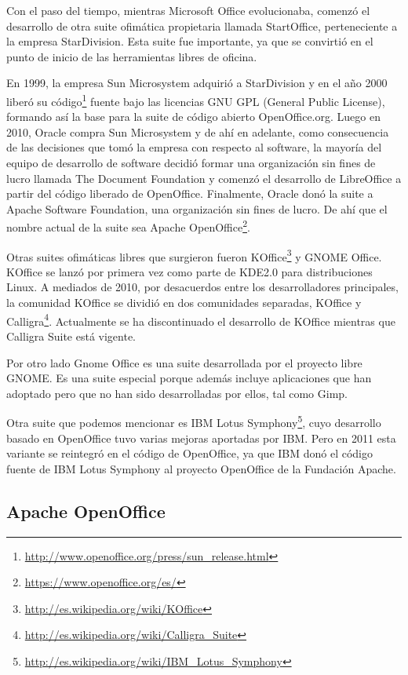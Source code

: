 \documentclass[12pt]{article}
\begin{document}
Con el paso del tiempo, mientras Microsoft Office evolucionaba, comenzó el desarrollo de otra suite ofimática propietaria llamada StartOffice, perteneciente a la empresa StarDivision. Esta suite fue importante, ya que se convirtió en el punto de inicio de las herramientas libres de oficina. 

En 1999, la empresa Sun Microsystem adquirió a StarDivision y en el año 2000 liberó su código\footnote{\url{http://www.openoffice.org/press/sun\_release.html}} fuente bajo las licencias GNU GPL (General Public License), formando así la base para la suite de código abierto OpenOffice.org. Luego en 2010, Oracle compra Sun Microsystem y de ahí en adelante, como consecuencia de las decisiones que tomó la empresa con respecto al software, la mayoría del equipo de desarrollo de software decidió formar una organización sin fines de lucro llamada The Document Foundation y comenzó el desarrollo de LibreOffice a partir del código liberado de OpenOffice. Finalmente, Oracle donó la suite a Apache Software Foundation, una organización sin fines de lucro. De ahí que el nombre actual de la suite sea Apache OpenOffice\footnote{\url{https://www.openoffice.org/es/}}. 

Otras suites ofimáticas libres que surgieron fueron KOffice\footnote{\url{http://es.wikipedia.org/wiki/KOffice}} y GNOME Office. KOffice se lanzó por primera vez como parte de KDE2.0 para distribuciones Linux. A mediados de 2010, por desacuerdos entre los desarrolladores principales, la comunidad KOffice se dividió en dos comunidades separadas, KOffice y Calligra\footnote{\url{http://es.wikipedia.org/wiki/Calligra\_Suite}}. Actualmente se ha discontinuado el desarrollo de KOffice mientras que Calligra Suite está vigente.

Por otro lado Gnome Office es una suite desarrollada por el proyecto libre GNOME. Es una suite especial porque además incluye aplicaciones que han adoptado pero que no han sido desarrolladas por ellos, tal como Gimp.  

Otra suite que podemos mencionar es IBM Lotus Symphony\footnote{\url{http://es.wikipedia.org/wiki/IBM\_Lotus\_Symphony}}, cuyo desarrollo basado en OpenOffice tuvo varias mejoras aportadas por IBM. Pero en 2011 esta variante se reintegró en el código de OpenOffice, ya que IBM donó el código fuente de IBM Lotus Symphony al proyecto OpenOffice de la Fundación Apache. 

\subsection{Apache OpenOffice}
\end{document}
